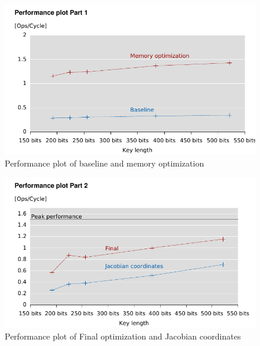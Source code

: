 \begin{figure}[h!]\centering
  \includegraphics[scale=0.7]{perfplot1}
  \caption{Performance plot of baseline and memory optimization\label{perfplot1}}
\end{figure}
\begin{figure}[h!]\centering
  \includegraphics[scale=0.7]{perfplot2}
  \caption{Performance plot of Final optimization and Jacobian coordinates\label{perfplot2}}
\end{figure}

